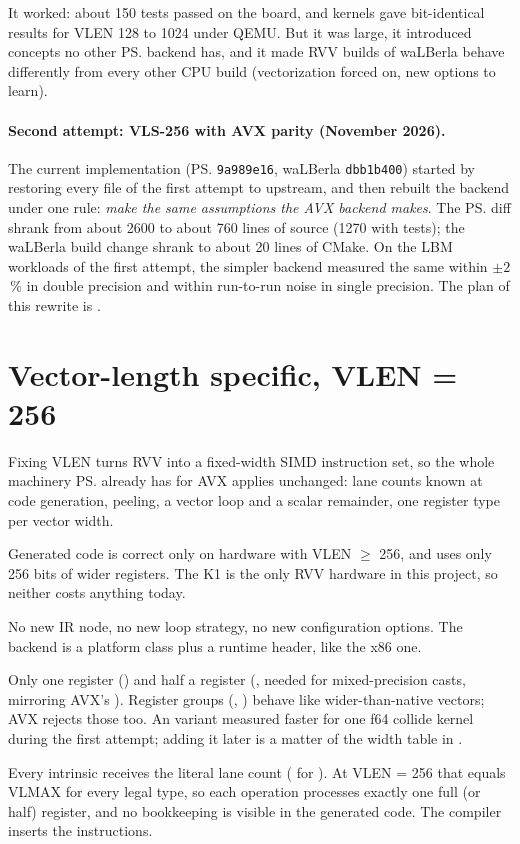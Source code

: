 It worked: about 150 tests passed on the board, and kernels gave bit-identical results
for VLEN 128 to 1024 under QEMU. But it was large, it introduced concepts no other
\ps{} backend has, and it made RVV builds of waLBerla behave differently from every
other CPU build (vectorization forced on, new options to learn).

\paragraph{Second attempt: VLS-256 with AVX parity (November 2026).}
The current implementation (\ps{} \texttt{9a989e16}, waLBerla \texttt{dbb1b400})
started by restoring every file of the first attempt to upstream, and then rebuilt the
backend under one rule: \emph{make the same assumptions the AVX backend makes}. The
\ps{} diff shrank from about 2600 to about 760 lines of source (1270 with tests); the
waLBerla build change shrank to about 20 lines of CMake. On the LBM workloads of the
first attempt, the simpler backend measured the same within $\pm 2$\,\% in double
precision and within run-to-run noise in single precision. The plan of this rewrite is
.

\section{Vector-length specific, VLEN = 256}\label{r02:sec:design-vls}

Fixing VLEN turns RVV into a fixed-width SIMD instruction set, so the whole machinery
\ps{} already has for AVX applies unchanged: lane counts known at code generation,
peeling, a vector loop and a scalar remainder, one register type per vector width.
\begin{description}[style=nextline]
  \item[What it costs] Generated code is correct only on hardware with VLEN $\geq$ 256,
    and uses only 256 bits of wider registers. The K1 is the only RVV hardware in this
    project, so neither costs anything today.
  \item[What it saves] No new IR node, no new loop strategy, no new configuration
    options. The backend is a platform class plus a runtime header, like the x86 one.
  \item[LMUL] Only one register () and half a register (, needed for
    mixed-precision casts, mirroring AVX's ). Register groups
    (, ) behave like wider-than-native vectors; AVX rejects those too.
    An  variant measured faster for one f64 collide kernel during the first
    attempt; adding it later is a matter of the width table in .
  \item[vl] Every intrinsic receives the literal lane count ( for
    ). At VLEN = 256 that equals VLMAX for every legal type, so each
    operation processes exactly one full (or half) register, and no 
    bookkeeping is visible in the generated code. The compiler inserts the
     instructions.
\end{description}

